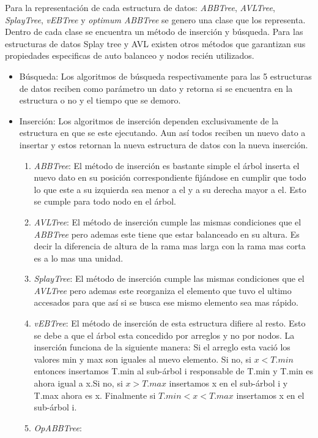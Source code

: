 \documentclass[letterpaper,12pt]{article}
\begin{document}
Para la representación de cada estructura de datos: \textit{ABBTree}, \textit{AVLTree}, \textit{SplayTree}, \textit{vEBTree} y \textit{optimum ABBTree} se genero una clase que los representa. Dentro de cada clase se encuentra un método de inserción y búsqueda. Para las estructuras de datos Splay tree y AVL existen otros métodos que garantizan sus propiedades especificas de auto balanceo y nodos recién utilizados.

\begin{itemize}
\item B\'usqueda: Los algoritmos de búsqueda respectivamente para las 5 estructuras de datos reciben como parámetro un dato y retorna si se encuentra en la estructura o no y el tiempo que se demoro.

\item Inserción: Los algoritmos de inserción dependen exclusivamente de la estructura en que se este ejecutando. Aun así todos reciben un nuevo dato a insertar y estos retornan la nueva estructura de datos con la nueva inserción.

\begin{enumerate}
  \item \textit{ABBTree}: El método de inserción es bastante simple el árbol inserta el nuevo dato en su posición correspondiente fijándose en cumplir que todo lo que este a su izquierda sea menor a el y a su derecha mayor a el. Esto se cumple para todo nodo en el árbol.
  \item \textit{AVLTree}: El método de inserción cumple las mismas condiciones que el \textit{ABBTree} pero ademas este tiene que estar balanceado en su altura. Es decir la diferencia de altura de la rama mas larga con la rama mas corta es a lo mas una unidad.
  \item \textit{SplayTree}: El método de inserción cumple las mismas condiciones que el \textit{AVLTree} pero ademas este reorganiza el elemento que tuvo el ultimo accesados para que así si se busca ese mismo elemento sea mas rápido.
   \item \textit{vEBTree}: El método de inserción de esta estructura difiere al resto. Esto se debe a que el árbol esta concedido por arreglos y no por nodos. La inserción funciona de la siguiente manera: Si el arreglo esta vació los valores min y max son iguales al nuevo elemento. Si no, si $x<T.min$ entonces insertamos T.min al sub-árbol i responsable de T.min y T.min es ahora igual a x.Si no, si $x>T.max$ insertamos x en el sub-árbol i y T.max ahora es x. Finalmente si $T.min<x<T.max$ insertamos x en el sub-árbol i.
   \item \textit{OpABBTree}:
   
\end{enumerate}
\end{itemize}
\end{document}
